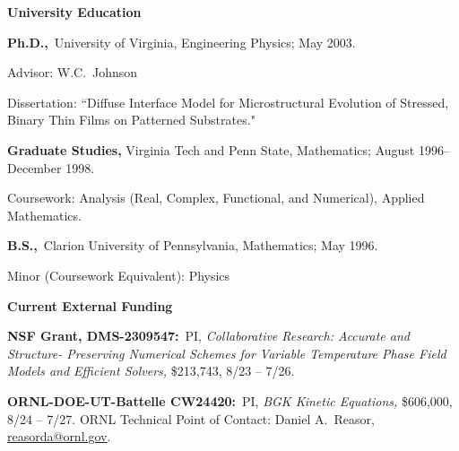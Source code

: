\documentclass[11pt]{letter}
\begin{document}
	\smallskip
  
{\LARGE\bf  University Education}
    \begin{description}
    \item
\textbf{Ph.D.,}~University of Virginia, Engineering Physics; May 2003.
    \begin{description}
    \item
Advisor: W.C.~Johnson
    \item
Dissertation: ``Diffuse Interface Model for Microstructural Evolution of Stressed, Binary Thin Films on Patterned Substrates."
    \end{description}
    \item
 \textbf{Graduate Studies,} Virginia Tech and Penn State, Mathematics; August 1996--December 1998.
    \begin{description}
    \item
Coursework: Analysis (Real, Complex, Functional, and Numerical), Applied Mathematics.
    \end{description}
    \item
\textbf{B.S.,}~Clarion University of Pennsylvania, Mathematics; May
1996.
    \begin{description}
    \item
Minor (Coursework Equivalent): Physics
    \end{description}
    \end{description}
	
	\smallskip

	
{\LARGE\bf Current External Funding}
    \begin{description}
    
	\item
\textbf{NSF Grant, DMS-2309547:}~PI, {\sl Collaborative Research: Accurate and Structure- Preserving Numerical Schemes for Variable Temperature Phase Field Models and Efficient Solvers,} \$213,743, 8/23 -- 7/26.

    \item
\textbf{ORNL-DOE-UT-Battelle CW24420:}~PI, {\sl BGK Kinetic Equations,} \$606,000, 8/24 -- 7/27. ORNL Technical Point of Contact: Daniel A.~Reasor, \url{reasorda@ornl.gov}.
    
    \end{description}
    
\end{document}
